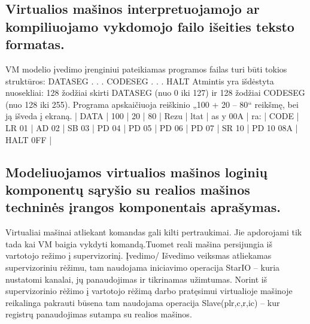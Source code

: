 \documentclass[oneside]{VUMIFPSkursinis}
\begin{document}
\subsection{Virtualios mašinos interpretuojamojo ar kompiliuojamo vykdomojo failo išeities teksto formatas.}
VM modelio įvedimo įrenginiui pateikiamas programos failas turi būti tokios struktūros: \newline
DATASEG\newline
.\newline
.\newline
.\newline
CODESEG\newline
.\newline
.\newline
.\newline
HALT\newline
Atmintis yra išdėstyta nuosekliai: 128 žodžiai skirti DATASEG (nuo 0 iki 127) ir 128 žodžiai\newline
CODESEG (nuo 128 iki 255).\newline
Programa apskaičiuoja reiškinio „100 + 20 – 80“ reikšmę, bei ją išveda į ekraną. | DATA | 100 | 20 | 80 | Rezu | ltat | as y\newline
00A | ra: | CODE | LR 01 | AD 02 | SB 03 | PD 04 | PD 05 | PD 06 | PD 07 | SR 10 | PD 10\newline
08A | HALT\newline
0FF |\newline
	\subsection{Modeliuojamos virtualios mašinos loginių komponentų sąryšio su realios mašinos techninės įrangos komponentais aprašymas.}
	Virtualiai mašinai atliekant komandas gali kilti pertraukimai. Jie apdorojami tik tada kai VM
baigia vykdyti komandą.Tuomet reali mašina persijungia iš vartotojo režimo į supervizorinį.\newline
Įvedimo/ Išvedimo veiksmas atliekamas supervizoriniu rėžimu, tam naudojama iniciavimo
operacija StarIO – kuria nustatomi kanalai, jų panaudojimas ir tikrinamas užimtumas.\newline
Norint iš supervizorinio rėžimo į vartotojo rėžimą darbo pratęsimui virtualioje mašinoje
reikalinga pakrauti būsena tam naudojama operacija Slave(plr,c,r,ic) – kur registrų panaudojimas
sutampa su realios mašinos.
\end{document}
